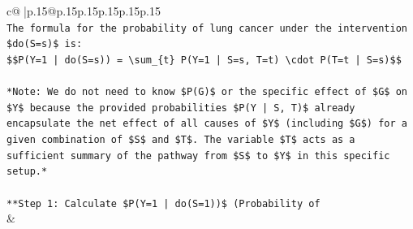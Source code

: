 \documentclass{article}
\begin{document}
{\begin{supertabular}{c@{$\;$}|p{.15\linewidth}@{}p{.15\linewidth}p{.15\linewidth}p{.15\linewidth}p{.15\linewidth}p{.15\linewidth}}
{{{\\ 
\texttt{The formula for the probability of lung cancer under the intervention \$do(S=s)\$ is:} \\
\texttt{\$\$P(Y=1 | do(S=s)) = \textbackslash{}sum\_\{t\} P(Y=1 | S=s, T=t) \textbackslash{}cdot P(T=t | S=s)\$\$} \\
\\ 
\texttt{*Note: We do not need to know \$P(G)\$ or the specific effect of \$G\$ on \$Y\$ because the provided probabilities \$P(Y | S, T)\$ already encapsulate the net effect of all causes of \$Y\$ (including \$G\$) for a given combination of \$S\$ and \$T\$. The variable \$T\$ acts as a sufficient summary of the pathway from \$S\$ to \$Y\$ in this specific setup.*} \\
\\ 
\texttt{**Step 1: Calculate \$P(Y=1 | do(S=1))\$ (Probability of} \\
            }
        }
    }
    & \\ \\


\end{supertabular}}
\end{document}
